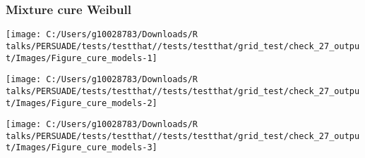 \documentclass[
]{article}
\begin{document}
\begin{table}[H]
\centering
\caption{\label{tab:Table_5}Cure proportions per group (lower and upper 95CI)}
\centering
{}
\end{table}

\clearpage

\clearpage

\subsubsection{Mixture cure Weibull}\label{mixture-cure-weibull}

\begin{flushleft}\texttt{[image: C:/Users/g10028783/Downloads/R talks/PERSUADE/tests/testthat//tests/testthat/grid\_test/check\_27\_output/Images/Figure\_cure\_models-1]} \end{flushleft}

\begin{flushleft}\texttt{[image: C:/Users/g10028783/Downloads/R talks/PERSUADE/tests/testthat//tests/testthat/grid\_test/check\_27\_output/Images/Figure\_cure\_models-2]} \end{flushleft}

\begin{flushleft}\texttt{[image: C:/Users/g10028783/Downloads/R talks/PERSUADE/tests/testthat//tests/testthat/grid\_test/check\_27\_output/Images/Figure\_cure\_models-3]} \end{flushleft}
\end{document}
